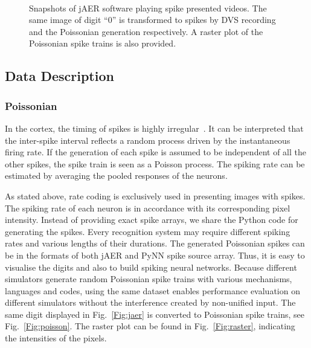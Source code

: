 \begin{figure*}[hbt]
  \centering
  \\
  
  \caption{
  Snapshots of jAER software playing spike presented videos.
  The same image of digit ``0'' is transformed to spikes by DVS recording and the Poissonian generation respectively.
  A raster plot of the Poissonian spike trains is also provided.}
  \label{fig:zero}
\end{figure*}

\subsection{Data Description}	
	\subsubsection{Poissonian}
	
	In the cortex, the timing of spikes is highly irregular~\citep{squire1998findings}.
	It can be interpreted that the inter-spike interval reflects a random process driven by the instantaneous firing rate.
	If the generation of each spike is assumed to be independent of all the other spikes, the spike train is seen as a Poisson process.
	The spiking rate can be estimated by averaging the pooled responses of the neurons.
		
	As stated above, rate coding is exclusively used in presenting images with spikes.
	The spiking rate of each neuron is in accordance with its corresponding pixel intensity.
	Instead of providing exact spike arrays, we share the Python code for generating the spikes.
	Every recognition system may require different spiking rates and various lengths of their durations.
	The generated Poissonian spikes can be in the formats of both jAER and PyNN spike source array.
	Thus, it is easy to visualise the digits and also to build spiking neural networks.
	Because different simulators generate random Poissonian spike trains with various mechanisms, languages and codes, using the same dataset enables performance evaluation on different simulators without the interference created by non-unified input.
	The same digit displayed in Fig.~\ref{Fig:jaer} is converted to Poissonian spike trains, see Fig.~\ref{Fig:poisson}.
	The raster plot can be found in Fig.~\ref{Fig:raster}, indicating the intensities of the pixels.


